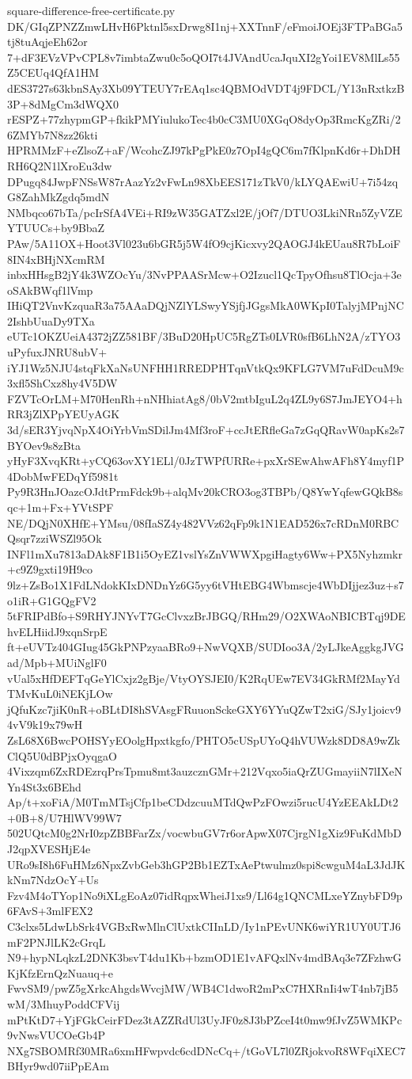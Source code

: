\documentclass[11pt]{article}
\theoremstyle{definition}
\theoremstyle{remark}
\begin{document}
\begin{filecontents*}[overwrite]{square-difference-free-certificate.py}
DK/GIqZPNZZmwLHvH6Pktnl5sxDrwg8I1nj+XXTnnF/eFmoiJOEj3FTPaBGa5tj8tuAqjeEh62or
7+dF3EVzVPvCPL8v7imbtaZwu0c5oQOI7t4JVAndUcaJquXI2gYoi1EV8MlLs55Z5CEUq4QfA1HM
dES3727s63kbnSAy3Xb09YTEUY7rEAq1sc4QBMOdVDT4j9FDCL/Y13nRxtkzB3P+8dMgCm3dWQX0
rESPZ+77zhypmGP+fkikPMYiulukoTec4b0cC3MU0XGqO8dyOp3RmcKgZRi/26ZMYb7N8zz26kti
HPRMMzF+eZlsoZ+aF/WcohcZJ97kPgPkE0z7OpI4gQC6m7fKlpnKd6r+DhDHRH6Q2N1lXroEu3dw
DPugq84JwpFNSsW87rAazYz2vFwLn98XbEES171zTkV0/kLYQAEwiU+7i54zqG8ZahMkZgdq5mdN
NMbqco67bTa/pcIrSfA4VEi+RI9zW35GATZxl2E/jOf7/DTUO3LkiNRn5ZyVZEYTUUCs+by9BbaZ
PAw/5A11OX+Hoot3Vl023u6bGR5j5W4fO9cjKicxvy2QAOGJ4kEUau8R7bLoiF8IN4xBHjNXcmRM
inbxHHsgB2jY4k3WZOcYu/3NvPPAASrMcw+O2Izucl1QcTpyOfhsu8TlOcja+3eoSAkBWqf1lVmp
IHiQT2VnvKzquaR3a75AAaDQjNZlYLSwyYSjfjJGgsMkA0WKpI0TalyjMPnjNC2IshbUuaDy9TXa
eUTc1OKZUeiA4372jZZ581BF/3BuD20HpUC5RgZTs0LVR0sfB6LhN2A/zTYO3uPyfuxJNRU8ubV+
iYJ1Wz5NJU4stqFkXaNsUNFHH1RREDPHTqnVtkQx9KFLG7VM7uFdDcuM9c3xfl5ShCxz8hy4V5DW
FZVTcOrLM+M70HenRh+nNHhiatAg8/0bV2mtbIguL2q4ZL9y6S7JmJEYO4+hRR3jZlXPpYEUyAGK
3d/sER3YjvqNpX4OiYrbVmSDilJm4Mf3roF+ccJtERfleGa7zGqQRavW0apKs2s7BYOev9s8zBta
yHyF3XvqKRt+yCQ63ovXY1ELl/0JzTWPfURRe+pxXrSEwAhwAFh8Y4myf1P4DobMwFEDqYf5981t
Py9R3HnJOazcOJdtPrmFdck9b+alqMv20kCRO3og3TBPb/Q8YwYqfewGQkB8sqc+1m+Fx+YVtSPF
NE/DQjN0XHfE+YMsu/08fIaSZ4y482VVz62qFp9k1N1EAD526x7cRDnM0RBCQsqr7zziWSZl95Ok
INFl1mXu7813aDAk8F1B1i5OyEZ1vslYsZnVWWXpgiHagty6Ww+PX5Nyhzmkr+c9Z9gxti19H9co
9lz+ZsBo1X1FdLNdokKIxDNDnYz6G5yy6tVHtEBG4Wbmscje4WbDIjjez3uz+s7o1iR+G1GQgFV2
5tFRIPdBfo+S9RHYJNYvT7GcClvxzBrJBGQ/RHm29/O2XWAoNBICBTqj9DEhvELHiidJ9xqnSrpE
ft+eUVTz404GIug45GkPNPzyaaBRo9+NwVQXB/SUDIoo3A/2yLJkeAggkgJVGad/Mpb+MUiNglF0
vUal5xHfDEFTqGeYlCxjz2gBje/VtyOYSJEI0/K2RqUEw7EV34GkRMf2MayYdTMvKuL0iNEKjLOw
jQfuKzc7jiK0nR+oBLtDI8hSVAsgFRuuonSckeGXY6YYuQZwT2xiG/SJy1joicv94vV9k19x79wH
ZsL68X6BwcPOHSYyEOolgHpxtkgfo/PHTO5cUSpUYoQ4hVUWzk8DD8A9wZkClQ5U0dBPjxOyqgaO
4Vixzqm6ZxRDEzrqPrsTpmu8mt3auzcznGMr+212Vqxo5iaQrZUGmayiiN7lIXeNYn4St3x6BEhd
Ap/t+xoFiA/M0TmMTsjCfp1beCDdzcuuMTdQwPzFOwzi5rucU4YzEEAkLDt2+0B+8/U7HlWV99W7
502UQtcM0g2NrI0zpZBBFarZx/vocwbuGV7r6orApwX07CjrgN1gXiz9FuKdMbDJ2qpXVESHjE4e
URo9sI8h6FuHMz6NpxZvbGeb3hGP2Bb1EZTxAePtwulmz0spi8cwguM4aL3JdJKkNm7NdzOcY+Us
Fzv4M4oTYop1No9iXLgEoAz07idRqpxWheiJ1xs9/Ll64g1QNCMLxeYZnybFD9p6FAvS+3mlFEX2
C3clxs5LdwLbSrk4VGBxRwMlnClUxtkCIInLD/Iy1nPEvUNK6wiYR1UY0UTJ6mF2PNJlLK2cGrqL
N9+hypNLqkzL2DNK3bsvT4du1Kb+bzmOD1E1vAFQxlNv4mdBAq3e7ZFzhwGKjKfzErnQzNuauq+e
FwvSM9/pwZ5gXrkcAhgdsWvcjMW/WB4C1dwoR2mPxC7HXRnIi4wT4nb7jB5wM/3MhuyPoddCFVij
mPtKtD7+YjFGkCeirFDez3tAZZRdUl3UyJF0z8J3bPZceI4t0mw9fJvZ5WMKPc9vNwsVUCOeGb4P
NXg7SBOMRf30MRa6xmHFwpvdc6cdDNcCq+/tGoVL7l0ZRjokvoR8WFqiXEC7BHyr9wd07iiPpEAm

\end{filecontents*}
\end{document}
